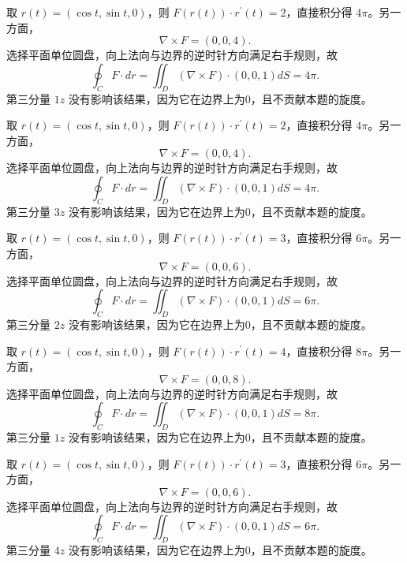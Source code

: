 \documentclass[12pt,fontset=fandol]{ctexart}
\begin{document}
\begin{solve}\label{ans:c43q20}
取 $r(t)=(\cos t,\sin t,0)$，则 $F(r(t))\cdot r^{\prime}(t)=2$，直接积分得 $4\pi$。另一方面，
\[
\nabla\times F=(0,0,4).
\]
选择平面单位圆盘，向上法向与边界的逆时针方向满足右手规则，故
\[
\oint_C F\cdot dr=\iint_D(\nabla\times F)\cdot(0,0,1)dS=4\pi.
\]
第三分量 $1z$ 没有影响该结果，因为它在边界上为0，且不贡献本题的旋度。
\end{solve}

\begin{solve}\label{ans:c43q21}
取 $r(t)=(\cos t,\sin t,0)$，则 $F(r(t))\cdot r^{\prime}(t)=2$，直接积分得 $4\pi$。另一方面，
\[
\nabla\times F=(0,0,4).
\]
选择平面单位圆盘，向上法向与边界的逆时针方向满足右手规则，故
\[
\oint_C F\cdot dr=\iint_D(\nabla\times F)\cdot(0,0,1)dS=4\pi.
\]
第三分量 $3z$ 没有影响该结果，因为它在边界上为0，且不贡献本题的旋度。
\end{solve}

\begin{solve}\label{ans:c43q22}
取 $r(t)=(\cos t,\sin t,0)$，则 $F(r(t))\cdot r^{\prime}(t)=3$，直接积分得 $6\pi$。另一方面，
\[
\nabla\times F=(0,0,6).
\]
选择平面单位圆盘，向上法向与边界的逆时针方向满足右手规则，故
\[
\oint_C F\cdot dr=\iint_D(\nabla\times F)\cdot(0,0,1)dS=6\pi.
\]
第三分量 $2z$ 没有影响该结果，因为它在边界上为0，且不贡献本题的旋度。
\end{solve}

\begin{solve}\label{ans:c43q23}
取 $r(t)=(\cos t,\sin t,0)$，则 $F(r(t))\cdot r^{\prime}(t)=4$，直接积分得 $8\pi$。另一方面，
\[
\nabla\times F=(0,0,8).
\]
选择平面单位圆盘，向上法向与边界的逆时针方向满足右手规则，故
\[
\oint_C F\cdot dr=\iint_D(\nabla\times F)\cdot(0,0,1)dS=8\pi.
\]
第三分量 $1z$ 没有影响该结果，因为它在边界上为0，且不贡献本题的旋度。
\end{solve}

\begin{solve}\label{ans:c43q24}
取 $r(t)=(\cos t,\sin t,0)$，则 $F(r(t))\cdot r^{\prime}(t)=3$，直接积分得 $6\pi$。另一方面，
\[
\nabla\times F=(0,0,6).
\]
选择平面单位圆盘，向上法向与边界的逆时针方向满足右手规则，故
\[
\oint_C F\cdot dr=\iint_D(\nabla\times F)\cdot(0,0,1)dS=6\pi.
\]
第三分量 $4z$ 没有影响该结果，因为它在边界上为0，且不贡献本题的旋度。
\end{solve}
\end{document}
